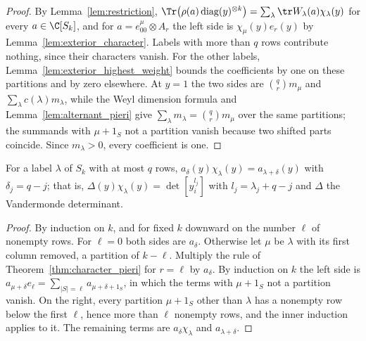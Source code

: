 \begin{proof}\leanok
    By Lemma~\ref{lem:restriction}, $\Tr\bigl(\rho(a)\operatorname{diag}(y)^{\otimes k}\bigr)
    =\sum_\lambda\tr W_\lambda(a)\chi_\lambda(y)$ for every $a\in\C[S_k]$, and for
    $a=e^\mu_{00}\otimes A_r$ the left side is $\chi_\mu(y)e_r(y)$ by
    Lemma~\ref{lem:exterior_character}. Labels with more than $q$ rows contribute nothing,
    since their characters vanish. For the other labels,
    Lemma~\ref{lem:exterior_highest_weight} bounds the coefficients by one on these
    partitions and by zero elsewhere. At $y=1$ the two sides
    are $\binom qrm_\mu$ and $\sum_\lambda c(\lambda)m_\lambda$, while the Weyl dimension
    formula and Lemma~\ref{lem:alternant_pieri} give $\sum_\lambda m_\lambda=\binom qrm_\mu$
    over the same partitions; the summands with $\mu+1_S$ not a partition vanish because two
    shifted parts coincide. Since $m_\lambda>0$, every coefficient is one.
\end{proof}

\begin{theorem}
    \label{thm:weyl_character}
    \leanok
    For a label $\lambda$ of $S_k$ with at most $q$ rows,
    $a_\delta(y)\chi_\lambda(y)=a_{\lambda+\delta}(y)$ with $\delta_j=q-j$; that is,
    $\Delta(y)\chi_\lambda(y)=\det[y_i^{l_j}]$ with $l_j=\lambda_j+q-j$ and $\Delta$ the
    Vandermonde determinant.
\end{theorem}

\begin{proof}\leanok
    By induction on $k$, and for fixed $k$ downward on the number $\ell$ of nonempty rows.
    For $\ell=0$ both sides are $a_\delta$. Otherwise let $\mu$ be $\lambda$ with its first
    column removed, a partition of $k-\ell$. Multiply the rule of
    Theorem~\ref{thm:character_pieri} for $r=\ell$ by $a_\delta$. By induction on $k$ the
    left side is $a_{\mu+\delta}e_\ell=\sum_{|S|=\ell}a_{\mu+\delta+1_S}$, in which the terms
    with $\mu+1_S$ not a partition vanish. On the right, every partition $\mu+1_S$ other
    than $\lambda$ has a nonempty row below the first $\ell$, hence more than $\ell$
    nonempty rows, and the inner induction applies to it. The remaining terms are
    $a_\delta\chi_\lambda$ and $a_{\lambda+\delta}$.
\end{proof}





